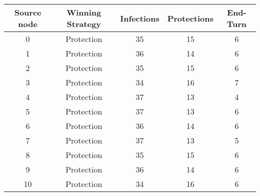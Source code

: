 \documentclass[results.tex]{subfiles}
\begin{document}
    \begin{center}
        \begin{tabular}{| c || c | c | c | c |}
            \hline
            {\bfseries Source node} & {\bfseries Winning Strategy} & {\bfseries Infections} & {\bfseries Protections}
            & {\bfseries End-Turn}
            \\  %
            \hline\hline
            0                       & Protection                   & 35                     & 15                      & 6                    \\
            \hline
            1                       & Protection                   & 36                     & 14                      & 6                    \\
            \hline
            2                       & Protection                   & 35                     & 15                      & 6                    \\
            \hline
            3                       & Protection                   & 34                     & 16                      & 7                    \\
            \hline
            4                       & Protection                   & 37                     & 13                      & 4                    \\
            \hline
            5                       & Protection                   & 37                     & 13                      & 6                    \\
            \hline
            6                       & Protection                   & 36                     & 14                      & 6                    \\
            \hline
            7                       & Protection                   & 37                     & 13                      & 5                    \\
            \hline
            8                       & Protection                   & 35                     & 15                      & 6                    \\
            \hline
            9                       & Protection                   & 36                     & 14                      & 6                    \\
            \hline
            10                      & Protection                   & 34                     & 16                      & 6                    \\

\end{tabular}
\end{center}
\end{document}
